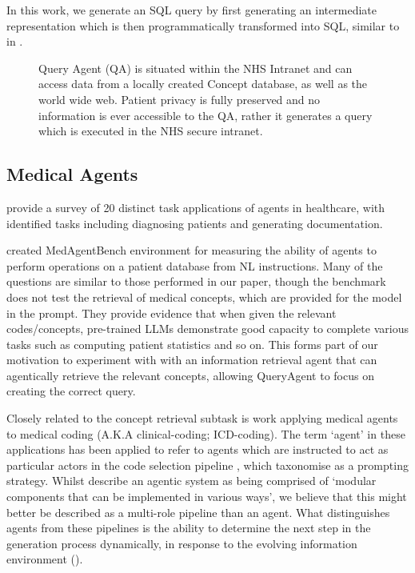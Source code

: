 \documentclass[11pt]{article}
\begin{document}
In this work, we generate an SQL query by first generating an intermediate representation which is then programmatically transformed into SQL, similar to in \cite{guo_towards_2019}.


\begin{figure}[htbp]
	\centering
	
	\caption{
Query Agent (QA) is situated within the NHS Intranet and can access data from a locally created Concept database, as well as the world wide web.
Patient privacy is fully preserved and no information is ever accessible to the QA, rather it generates a query which is executed in the NHS secure intranet. 
}
	\label{fig:system-diagram}
\end{figure}

\subsection{Medical Agents}
\citep{wang_survey_2025} provide a survey of 20 distinct task applications of agents in healthcare, with identified tasks including diagnosing patients and generating documentation.

\citep{jiang_medagentbench_2025} created MedAgentBench environment for measuring the ability of agents to perform operations on a patient database from NL instructions.
Many of the questions are similar to those performed in our paper, though the benchmark does not test the retrieval of medical concepts, which are provided for the model in the prompt.
They provide evidence that when given the relevant codes/concepts, pre-trained LLMs demonstrate good capacity to complete various tasks such as computing patient statistics and so on.
This forms part of our motivation to experiment with with an information retrieval agent that can agentically retrieve the relevant concepts, allowing QueryAgent to focus on creating the correct query. 

Closely related to the concept retrieval subtask is work applying medical agents to medical coding (A.K.A clinical-coding; ICD-coding). The term `agent' in these applications has been applied to refer to agents which are instructed to act as particular actors in the code selection pipeline \cite{li_exploring_2024,motzfeldt_code_2025}, which \cite{schulhoff_prompt_2024} taxonomise as a prompting strategy.
Whilst \citet{motzfeldt_code_2025} describe an agentic system as being comprised of `modular components that can be implemented in various ways', we believe that this might better be described as a multi-role pipeline than an agent.
What distinguishes agents from these pipelines is the ability to determine the next step in the generation process dynamically, in response to the evolving information environment (\citet{zhang_agentic_2025}).
\end{document}
